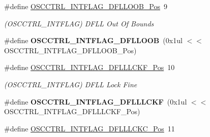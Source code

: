 \begin{DoxyCompactItemize}
\item 
\hypertarget{group___s_a_m_l21___o_s_c_c_t_r_l_gae2b4598023dd48f296dc3ed55faa93f7}{}\#define \hyperlink{group___s_a_m_l21___o_s_c_c_t_r_l_gae2b4598023dd48f296dc3ed55faa93f7}{O\+S\+C\+C\+T\+R\+L\+\_\+\+I\+N\+T\+F\+L\+A\+G\+\_\+\+D\+F\+L\+L\+O\+O\+B\+\_\+\+Pos}~9\label{group___s_a_m_l21___o_s_c_c_t_r_l_gae2b4598023dd48f296dc3ed55faa93f7}

\begin{DoxyCompactList}\small\item\em (O\+S\+C\+C\+T\+R\+L\+\_\+\+I\+N\+T\+F\+L\+A\+G) D\+F\+L\+L Out Of Bounds \end{DoxyCompactList}\item 
\hypertarget{group___s_a_m_l21___o_s_c_c_t_r_l_gac2b9f596b1010b378d2090a3c9aa22c6}{}\#define {\bfseries O\+S\+C\+C\+T\+R\+L\+\_\+\+I\+N\+T\+F\+L\+A\+G\+\_\+\+D\+F\+L\+L\+O\+O\+B}~(0x1ul $<$$<$ O\+S\+C\+C\+T\+R\+L\+\_\+\+I\+N\+T\+F\+L\+A\+G\+\_\+\+D\+F\+L\+L\+O\+O\+B\+\_\+\+Pos)\label{group___s_a_m_l21___o_s_c_c_t_r_l_gac2b9f596b1010b378d2090a3c9aa22c6}

\item 
\hypertarget{group___s_a_m_l21___o_s_c_c_t_r_l_ga6fbc9c37d06550c125c08973065bba1f}{}\#define \hyperlink{group___s_a_m_l21___o_s_c_c_t_r_l_ga6fbc9c37d06550c125c08973065bba1f}{O\+S\+C\+C\+T\+R\+L\+\_\+\+I\+N\+T\+F\+L\+A\+G\+\_\+\+D\+F\+L\+L\+L\+C\+K\+F\+\_\+\+Pos}~10\label{group___s_a_m_l21___o_s_c_c_t_r_l_ga6fbc9c37d06550c125c08973065bba1f}

\begin{DoxyCompactList}\small\item\em (O\+S\+C\+C\+T\+R\+L\+\_\+\+I\+N\+T\+F\+L\+A\+G) D\+F\+L\+L Lock Fine \end{DoxyCompactList}\item 
\hypertarget{group___s_a_m_l21___o_s_c_c_t_r_l_gae86b4680a6e9a51bebe423db96a0addd}{}\#define {\bfseries O\+S\+C\+C\+T\+R\+L\+\_\+\+I\+N\+T\+F\+L\+A\+G\+\_\+\+D\+F\+L\+L\+L\+C\+K\+F}~(0x1ul $<$$<$ O\+S\+C\+C\+T\+R\+L\+\_\+\+I\+N\+T\+F\+L\+A\+G\+\_\+\+D\+F\+L\+L\+L\+C\+K\+F\+\_\+\+Pos)\label{group___s_a_m_l21___o_s_c_c_t_r_l_gae86b4680a6e9a51bebe423db96a0addd}

\item 
\hypertarget{group___s_a_m_l21___o_s_c_c_t_r_l_ga2a4786711d775d7a9a3c56f1fcfaea2f}{}\#define \hyperlink{group___s_a_m_l21___o_s_c_c_t_r_l_ga2a4786711d775d7a9a3c56f1fcfaea2f}{O\+S\+C\+C\+T\+R\+L\+\_\+\+I\+N\+T\+F\+L\+A\+G\+\_\+\+D\+F\+L\+L\+L\+C\+K\+C\+\_\+\+Pos}~11\label{group___s_a_m_l21___o_s_c_c_t_r_l_ga2a4786711d775d7a9a3c56f1fcfaea2f}


\end{DoxyCompactItemize}
